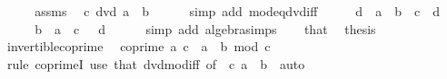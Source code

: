 \begin{isabellebody}
%
\isadelimproof
%
\endisadelimproof
%
\isatagproof
{}\isamarkupfalse%
\ {\isacharminus}{\kern0pt}\isanewline
\ \ \isamarkupfalse%
\ assms\ \isamarkupfalse%
\ {\isachardoublequoteopen}c\ dvd\ a\ {\isacharminus}{\kern0pt}\ b{\isachardoublequoteclose}\isanewline
\ \ \ \ \isamarkupfalse%
\ {\isacharparenleft}{\kern0pt}simp\ add{\isacharcolon}{\kern0pt}\ mod{\isacharunderscore}{\kern0pt}eq{\isacharunderscore}{\kern0pt}dvd{\isacharunderscore}{\kern0pt}iff{\isacharparenright}{\kern0pt}\isanewline
\ \ \isamarkupfalse%
\ \isamarkupfalse%
\ d\ \ {\isachardoublequoteopen}a\ {\isacharminus}{\kern0pt}\ b\ {\isacharequal}{\kern0pt}\ c\ {\isacharasterisk}{\kern0pt}\ d{\isachardoublequoteclose}\ \isacommand{{\isachardot}{\kern0pt}{\isachardot}{\kern0pt}}\isamarkupfalse%
\isanewline
\ \ \isamarkupfalse%
\ \isamarkupfalse%
\ {\isachardoublequoteopen}b\ {\isacharequal}{\kern0pt}\ a\ {\isacharplus}{\kern0pt}\ c\ {\isacharasterisk}{\kern0pt}\ {\isacharminus}{\kern0pt}\ d{\isachardoublequoteclose}\isanewline
\ \ \ \ \isamarkupfalse%
\ {\isacharparenleft}{\kern0pt}simp\ add{\isacharcolon}{\kern0pt}\ algebra{\isacharunderscore}{\kern0pt}simps{\isacharparenright}{\kern0pt}\isanewline
\ \ \isamarkupfalse%
\ that\ \isamarkupfalse%
\ thesis\ \isacommand{{\isachardot}{\kern0pt}}\isamarkupfalse%
\isanewline
{}\isamarkupfalse%
%
\endisatagproof
{\isafoldproof}%
%
\isadelimproof
\isanewline
%
\endisadelimproof
\isanewline
{}\isamarkupfalse%
\ invertible{\isacharunderscore}{\kern0pt}coprime{\isacharcolon}{\kern0pt}\isanewline
\ \ {\isachardoublequoteopen}coprime\ a\ c{\isachardoublequoteclose}\ \ {\isachardoublequoteopen}a\ {\isacharasterisk}{\kern0pt}\ b\ mod\ c\ {\isacharequal}{\kern0pt}\ {}{\isachardoublequoteclose}\isanewline
%
\isadelimproof
\ \ %
\endisadelimproof
%
\isatagproof
{}\isamarkupfalse%
\ {\isacharparenleft}{\kern0pt}rule\ coprimeI{\isacharparenright}{\kern0pt}\ {\isacharparenleft}{\kern0pt}use\ that\ dvd{\isacharunderscore}{\kern0pt}mod{\isacharunderscore}{\kern0pt}iff\ {\isacharbrackleft}{\kern0pt}of\ {\isacharunderscore}{\kern0pt}\ c\ {\isachardoublequoteopen}a\ {\isacharasterisk}{\kern0pt}\ b{\isachardoublequoteclose}{\isacharbrackright}{\kern0pt}\ \ auto{\isacharparenright}{\kern0pt}%
\endisatagproof
{\isafoldproof}%
%
\isadelimproof
\isanewline
%
\endisadelimproof
\isanewline
{}\isamarkupfalse%

\end{isabellebody}
